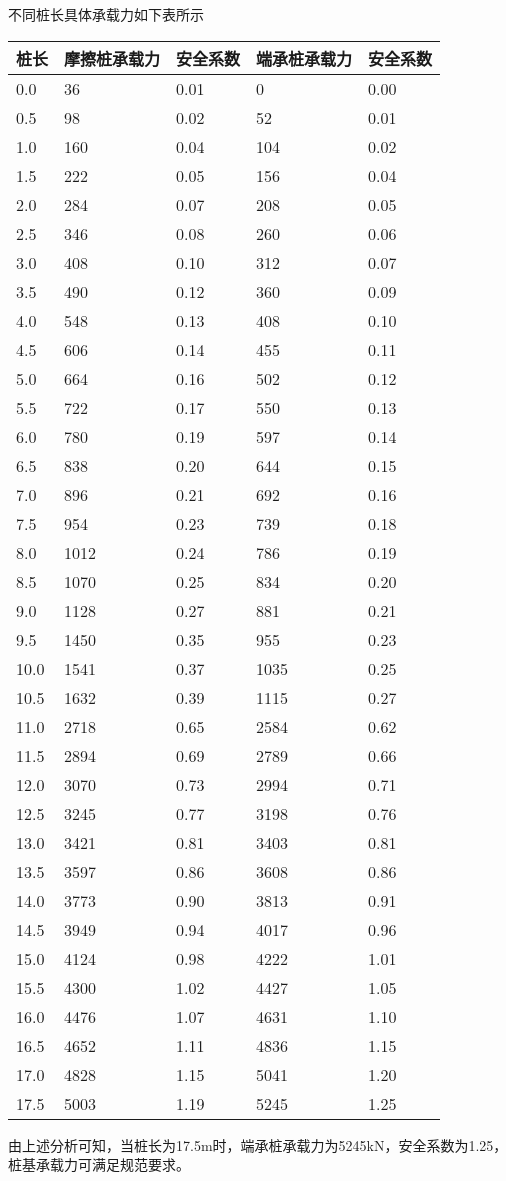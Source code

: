 \documentclass[cs4size, UTF8]{ctexart}%
\begin{document}
%

%
不同桩长具体承载力如下表所示%
\begin{longtable}{p{1.5cm}|ll|ll}%
\hline%
桩长&摩擦桩承载力&安全系数&端承桩承载力&安全系数\\%
\hline%
0.0&36&0.01&0&0.00\\%
0.5&98&0.02&52&0.01\\%
1.0&160&0.04&104&0.02\\%
1.5&222&0.05&156&0.04\\%
2.0&284&0.07&208&0.05\\%
2.5&346&0.08&260&0.06\\%
3.0&408&0.10&312&0.07\\%
3.5&490&0.12&360&0.09\\%
4.0&548&0.13&408&0.10\\%
4.5&606&0.14&455&0.11\\%
5.0&664&0.16&502&0.12\\%
5.5&722&0.17&550&0.13\\%
6.0&780&0.19&597&0.14\\%
6.5&838&0.20&644&0.15\\%
7.0&896&0.21&692&0.16\\%
7.5&954&0.23&739&0.18\\%
8.0&1012&0.24&786&0.19\\%
8.5&1070&0.25&834&0.20\\%
9.0&1128&0.27&881&0.21\\%
9.5&1450&0.35&955&0.23\\%
10.0&1541&0.37&1035&0.25\\%
10.5&1632&0.39&1115&0.27\\%
11.0&2718&0.65&2584&0.62\\%
11.5&2894&0.69&2789&0.66\\%
12.0&3070&0.73&2994&0.71\\%
12.5&3245&0.77&3198&0.76\\%
13.0&3421&0.81&3403&0.81\\%
13.5&3597&0.86&3608&0.86\\%
14.0&3773&0.90&3813&0.91\\%
14.5&3949&0.94&4017&0.96\\%
15.0&4124&0.98&4222&1.01\\%
15.5&4300&1.02&4427&1.05\\%
16.0&4476&1.07&4631&1.10\\%
16.5&4652&1.11&4836&1.15\\%
17.0&4828&1.15&5041&1.20\\%
17.5&5003&1.19&5245&1.25\\%
\hline%
\end{longtable}%
由上述分析可知，当桩长为17.5m时，端承桩承载力为5245kN，安全系数为1.25，桩基承载力可满足规范要求。

%
\end{document}
